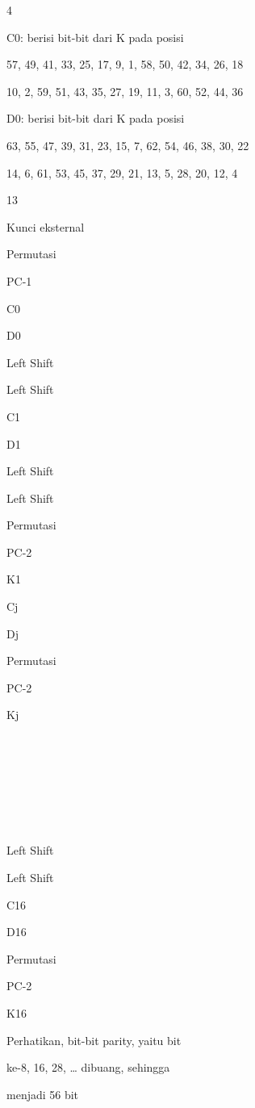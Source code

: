 \documentclass{article}
\begin{document}
4 


C0:  berisi bit-bit dari K pada posisi 

57,  49,  41,  33, 25, 17,   9,   1, 58, 50,  42, 34, 26, 18 

10,    2,  59, 51, 43, 35, 27, 19, 11,   3, 60, 52, 44,  36 



D0:  berisi bit-bit dari K pada posisi 

63,  55, 47,  39, 31, 23,  15,   7,  62, 54, 46,  38,  30, 22 

14,    6, 61,  53, 45, 37,  29, 21,  13,   5, 28,  20,  12,   4 

13

Kunci eksternal

Permutasi

PC-1

C0

D0

Left Shift

Left Shift

C1

D1

Left Shift

Left Shift

Permutasi

PC-2

K1

Cj

Dj

Permutasi

PC-2

Kj









Left Shift

Left Shift

C16

D16

Permutasi

PC-2

K16

Perhatikan, bit-bit parity, yaitu bit 

ke-8, 16, 28, … dibuang, sehingga 

menjadi 56 bit
\end{document}

